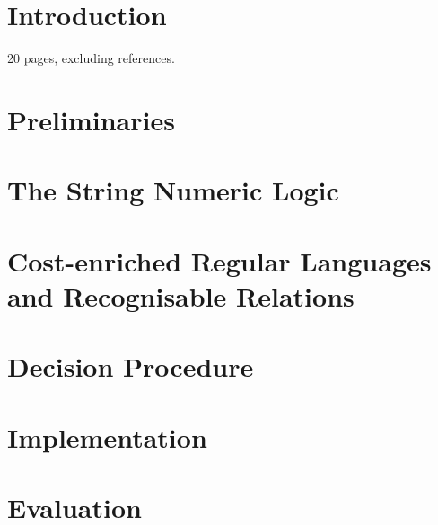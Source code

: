 \documentclass{llncs}
\begin{document}
\section{Introduction}

20 pages, excluding references.



\section{Preliminaries}




\section{The String Numeric Logic}




\section{Cost-enriched Regular Languages and Recognisable Relations}




\section{Decision Procedure}




\section{Implementation}




\section{Evaluation}
\end{document}
